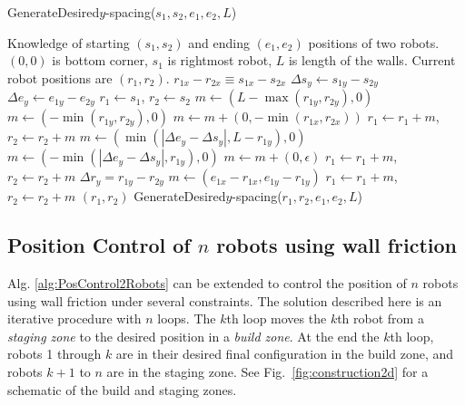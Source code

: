 \begin{algorithm}
\caption{GenerateDesired$y$-spacing($s_1,s_2,e_1,e_2,L$)}\label{alg:YControl}
\begin{algorithmic}[1]
\Require Knowledge of starting $(s_1,s_2)$ and ending $(e_1,e_2)$ positions of  two robots. 
$(0,0)$ is bottom corner, $s_1$ is rightmost robot, 
 $L$ is length of the walls. Current robot positions are $(r_1,r_2)$.
\Ensure   $ r_{1x} - r_{2x}  \equiv s_{1x} - s_{2x} $   %
\State $ \Delta s_y  \gets s_{1y} - s_{2y} $
\State $ \Delta e_y \gets e_{1y} - e_{2y} $
\State $ r_1 \gets s_1$, $ r_2 \gets s_2$
\State $ m \gets ( L-\max( r_{1y},r_{2y}) ,0)   $ 
\Else 
\State  $ m \gets ( -\min( r_{1y},r_{2y}),0 )    $ 
\EndIf
\State $m  \gets  m + (0, -\min( r_{1x},r_{2x} ))$ 
\State $ r_1 \gets r_1+m$, $ r_2 \gets r_2+m$ 
\State $ m \gets (\min(|\Delta e_y - \Delta s_y |, L- r_{1y}), 0)$  
\Else
\State $ m \gets (-\min(|\Delta e_y - \Delta s_y |, r_{1y}), 0)$
\EndIf 
\State $m  \gets  m + (0, \epsilon)$ 
\State $ r_1 \gets r_1+m$, $ r_2 \gets r_2+m$ 
\State $\Delta r_y = r_{1y} - r_{2y}$
\State   $ m \gets (e_{1x}-r_{1x}, e_{1y}-r_{1y})$
\State $ r_1 \gets r_1+m$, $ r_2 \gets r_2+m$ 
\State  \Return $(r_1,r_2)$
\Else   
\State \Return GenerateDesired$y$-spacing($r_1,r_2,e_1,e_2,L$)
\EndIf
\end{algorithmic}
\end{algorithm}






\subsection{Position Control of $n$ robots using wall friction}\label{sec:PostionControlnRobots}
Alg. \ref{alg:PosControl2Robots}  can be extended to control the position of $n$ robots using wall friction under several constraints. The solution described here is an iterative procedure with $n$ loops. The $k$th loop moves the $k$th robot from a \emph{staging zone} to the desired position in a \emph{build zone}. At the end the $k$th loop, robots 1 through $k$ are in their desired final configuration in the build zone, and robots $k+1$ to $n$ are in the staging zone. See Fig.~\ref{fig:construction2d} for a schematic of the build and staging zones.



